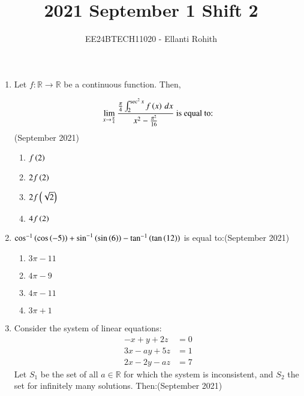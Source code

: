 \documentclass[journal,12pt,onecolumn]{IEEEtran}
\theoremstyle{remark}
\begin{document}

\vspace{3cm}

\title{2021 September 1 Shift 2}
\author{EE24BTECH11020 -  Ellanti Rohith}
\maketitle

\renewcommand{\thefigure}{\theenumi}
\renewcommand{\thetable}{\theenumi}



\begin{enumerate}

\item Let $f : \mathbb{R} \to \mathbb{R}$ be a continuous function. Then,

\begin{align*}
\lim_{x \to \frac{\pi}{4}} \frac{\frac{\pi}{4} \int_{2}^{\sec^2 x} f\left(x\right) \, dx}{x^2 - \frac{\pi^2}{16}} \text{  is equal to:}
\end{align*}
\hfill (September 2021)


\begin{multicols}{4}
\begin{enumerate}
    \item $f\left(2\right)$
    \item $2f\left(2\right)$
    \item $2f\left(\sqrt{2}\right)$
    \item $4f\left(2\right)$
\end{enumerate}
\end{multicols}

\item $\cos^{-1}\left(\cos\left(-5\right)\right) + \sin^{-1}\left(\sin\left(6\right)\right) - \tan^{-1}\left(\tan\left(12\right)\right)$ is equal to:\hfill (September 2021)
\begin{multicols}{2}
    \begin{enumerate}
    \item $3\pi - 11$
    \item $4\pi - 9$
    \item $4\pi - 11$
    \item $3\pi + 1$
\end{enumerate}
\end{multicols}


\item Consider the system of linear equations:
\begin{align*}
-x + y + 2z &= 0 \\
3x - ay + 5z &= 1 \\
2x - 2y - az &= 7
\end{align*}
Let $S_1$ be the set of all $a \in \mathbb{R}$ for which the system is inconsistent, and $S_2$ the set for infinitely many solutions. Then:\hfill (September 2021)


\end{enumerate}
\end{document}
